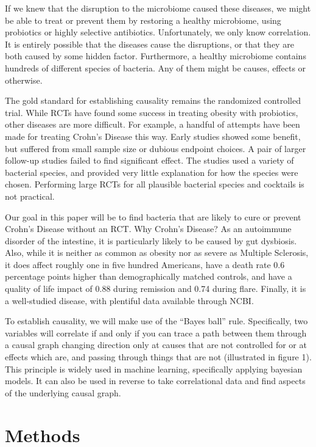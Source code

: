 \documentclass[a4paper]{article}
\begin{document}
If we knew that the disruption to the microbiome caused these
diseases, we might be able to treat or prevent them by restoring a
healthy microbiome, using probiotics or highly selective antibiotics.
Unfortunately, we only know correlation.  It is entirely possible that
the diseases cause the disruptions, or that they are both caused by
some hidden factor.  Furthermore, a healthy microbiome contains
hundreds of different species of bacteria.  Any of them might be
causes, effects or otherwise.


The gold standard for establishing causality remains the randomized
controlled trial.  While RCTs have found some success in treating
obesity with probiotics\cite{rctob}, other diseases are more difficult.  For
example, a handful of attempts have been made for treating Crohn's
Disease this way.  Early studies showed some benefit, but suffered
from small sample size or dubious endpoint choices.   A pair of larger
follow-up studies failed to find significant effect.\cite{rctma}  The studies
used a variety of bacterial species, and provided very little
explanation for how the species were chosen.  Performing large RCTs
for all plausible bacterial species and cocktails is not practical.


Our goal in this paper will be to find bacteria that are likely to
cure or prevent Crohn's Disease without an RCT.  Why Crohn's Disease?
As an autoimmune disorder of the intestine, it is particularly likely
to be caused by gut dysbiosis.  Also, while it is neither as common as
obesity nor as severe as Multiple Sclerosis, it does affect roughly
one in five hundred Americans, have a death rate 0.6 percentage points
higher than demographically matched controls\cite{mort}, and have a
quality of life impact of 0.88 during remission and 0.74 during
flare\cite{qol}.  Finally, it is a well-studied disease, with plentiful data
available through NCBI.

To establish causality, we will make use of the ``Bayes ball'' rule.
Specifically, two variables will correlate if and only if you can
trace a path between them through a causal graph changing direction
only at causes that are not controlled for or at effects which are,
and passing through things that are not (illustrated in figure 1).  This
principle is widely used in machine learning, specifically applying
bayesian models.  It can also be used in reverse to take correlational
data and find aspects of the underlying causal graph.\cite{causal}



\section{Methods}
\end{document}
